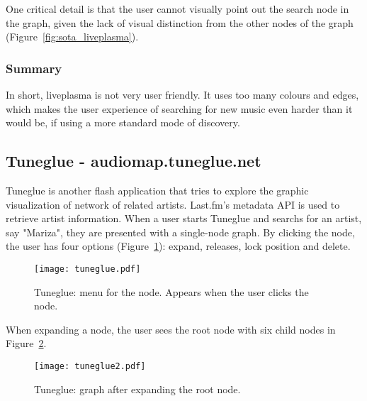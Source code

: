       One critical detail is that the user cannot visually point out the search node in the graph, given the lack of visual distinction from the other nodes of the graph (Figure~\ref{fig:sota_liveplasma}).


    \subsubsection{Summary} %
    \label{ssub:liveplasma_summary}

      In short, liveplasma is not very user friendly. 
      It uses too many colours and edges, which makes the user experience of searching for new music even harder than it would be, if using a more standard mode of discovery.



  \subsection{Tuneglue - audiomap.tuneglue.net} %
  \label{sub:tuneglue}

    Tuneglue is another flash application that tries to explore the graphic visualization of network of related artists.
    Last.fm's metadata API is used to retrieve artist information.
    When a user starts Tuneglue and searchs for an artist, say "Mariza", they are presented with a single-node graph.
    By clicking the node, the user has four options (Figure~\ref{fig:sota_tuneglue}): expand, releases, lock position and delete.


    \begin{figure}[hb]
      \begin{center}
        \texttt{[image: tuneglue.pdf]}
      \end{center}
      \caption{Tuneglue: menu for the node. Appears when the user clicks the node.}
      \label{fig:sota_tuneglue}
    \end{figure}

    When expanding a node, the user sees the root node with six child nodes in Figure~\ref{fig:sota_tuneglue2}.

    \begin{figure}[H]
      \begin{center}
        \texttt{[image: tuneglue2.pdf]}
      \end{center}
      \caption{Tuneglue: graph after expanding the root node.}
      \label{fig:sota_tuneglue2}
    \end{figure}

